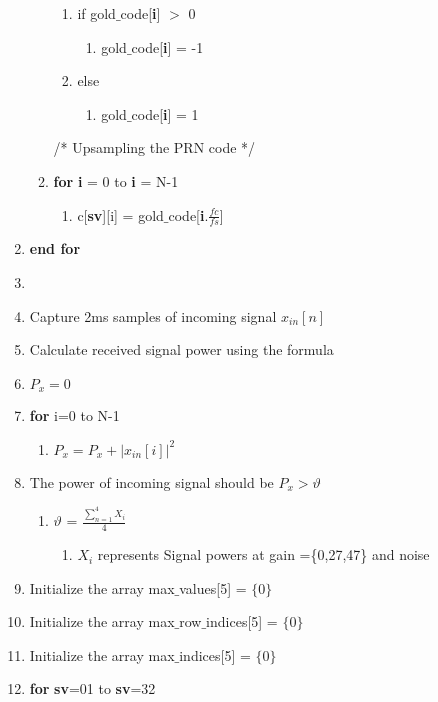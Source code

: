 \documentclass[journal,10pt,onecolumn]{article}
\providecommand{\abs}[1]{\left\vert#1\right\vert}
\begin{document}
\begin{enumerate}
\begin{enumerate}
        \begin{enumerate}
            \item[] if gold$\_$code[\textbf{i}] $>$  0 
            \begin{enumerate}
                \item[]  gold$\_$code[\textbf{i}] = -1
            \end{enumerate}
            \item[] else
            \begin{enumerate}
                \item[]  gold$\_$code[\textbf{i}] = 1
            \end{enumerate}
        \end{enumerate} 
    /* Upsampling the PRN code */

        \item[] \textbf{for} \textbf{i} = 0 to \textbf{i} = N-1
        \begin{enumerate}
            \item[] c[\textbf{sv}][i] = gold$\_$code[\textbf{i}.$\frac{fc}{fs}$]
        \end{enumerate}
        
    \end{enumerate}
    \item[] \textbf{end for}
    \item[] \item Capture 2ms samples of incoming signal $x_{in}[n]$
    \item Calculate received signal power using the formula
    \item[] $P_x=0$
    \item[] \textbf{for} i=0 to N-1
    \begin{enumerate}
        \item[] $P_x= P_x+\abs{x_{in}[i]}^2$
    \end{enumerate} 
    \item The power of incoming signal should be $P_x$$>$$\vartheta $
    \begin{enumerate}
        \item[] $\vartheta$ = $\frac{\sum_{n = 1}^{4}X_i}{4}$
        \begin{enumerate}
            \item[] $X_i$ represents Signal powers at gain =\{0,27,47\} and noise
        \end{enumerate}
    \end{enumerate}  
    
    \item Initialize the array max$\_$values[5] = $\{0\}$
    \item Initialize the array max$\_$row$\_$indices[5] = $\{0\}$
    \item Initialize the array max$\_$indices[5] = $\{0\}$
    \item \textbf{for} \textbf{sv}=01 to \textbf{sv}=32
    

\end{enumerate}
\end{document}
